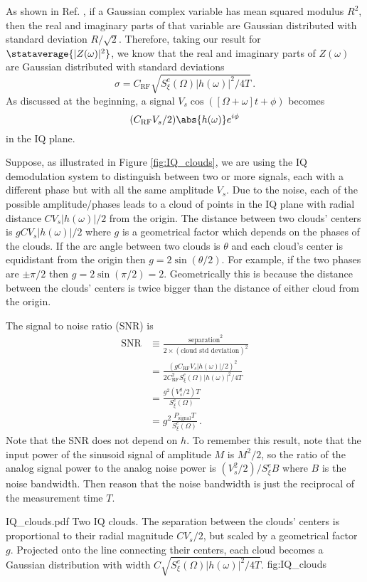 
As shown in Ref. \cite{Sank:whiteNoiseDFT}, if a Gaussian complex variable has mean squared modulus $R^2$, then the real and imaginary parts of that variable are Gaussian distributed with standard deviation $R / \sqrt{2}$.
Therefore, taking our result for $\stataverage{|Z(\omega)|^2}$, we know that the real and imaginary parts of $Z(\omega)$ are Gaussian distributed with standard deviations
\begin{equation}
  \sigma = C_\text{RF} \sqrt{S^e_\xi(\Omega) |h(\omega)|^2 / 4 T} \, .
\end{equation}
As discussed at the beginning, a signal $V_s \cos([\Omega + \omega] t + \phi)$ becomes
\begin{equation*}
  (C_\text{RF} V_s / 2) \abs{h(\omega)} e^{i \phi}
\end{equation*}
in the IQ plane.

Suppose, as illustrated in Figure \ref{fig:IQ_clouds}, we are using the IQ demodulation system to distinguish between two or more signals, each with a different phase but with all the same amplitude $V_s$.
Due to the noise, each of the possible amplitude/phases leads to a cloud of points in the IQ plane with radial distance $C V_s |h(\omega)|/2$ from the origin.
The distance between two clouds' centers is $g C V_s |h(\omega)| / 2$ where $g$ is a geometrical factor which depends on the phases of the clouds.
If the arc angle between two clouds is $\theta$ and each cloud's center is equidistant from the origin then $g = 2 \sin(\theta / 2)$.
For example, if the two phases are $\pm\pi/2$ then $g=2 \sin(\pi/2) = 2$.
Geometrically this is because the distance between the clouds' centers is twice bigger than the distance of either cloud from the origin.

The signal to noise ratio (SNR) is
\begin{align}
\text{SNR}
  & \equiv \frac{\text{separation}^2}{2 \times (\text{cloud std deviation})^2} \nonumber \\
  &= \frac{(g C_\text{RF} V_s |h(\omega)|/2)^2}{2 C_\text{RF}^2 S^e_\xi(\Omega) |h(\omega)|^2 / 4T} \nonumber \\
  &= \frac{g^2 (V_s^2/2) T}{S^e_\xi(\Omega)} \nonumber \\
  &= g^2 \frac{P_\text{signal} T}{S^e_\xi(\Omega)}
  \, .
\end{align}
Note that the SNR does not depend on $h$.
To remember this result, note that the input power of the sinusoid signal of amplitude $M$ is $M^2/2$, so the ratio of the analog signal power to the analog noise power is $(V_s^2 / 2) / S^e_\xi B$ where $B$ is the noise bandwidth.
Then reason that the noise bandwidth is just the reciprocal of the measurement time $T$.

{IQ_clouds.pdf}
{Two IQ clouds. The separation between the clouds' centers is proportional to their radial magnitude $C V_s / 2$, but scaled by a geometrical factor $g$.
Projected onto the line connecting their centers, each cloud becomes a Gaussian distribution with width $C \sqrt{S^e_\xi(\Omega)|h(\omega)|^2/4T}$.}
{fig:IQ_clouds}

